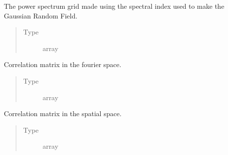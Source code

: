 \documentclass[letterpaper,10pt,english]{sphinxmanual}
\begin{document}
\begin{fulllineitems}
\begin{fulllineitems}
\begin{quote}
\begin{description}
\end{description}\end{quote}

\end{fulllineitems}


\begin{fulllineitems}
\label{\detokenize{gaussClass:gaussClass.GaussianRandomField.PowerSpectrum}}
\sphinxAtStartPar
The power spectrum grid made using the spectral index used to make the Gaussian Random Field.
\begin{quote}\begin{description}
\item[{Type}] \leavevmode
\sphinxAtStartPar
array

\end{description}\end{quote}

\end{fulllineitems}


\begin{fulllineitems}
\label{\detokenize{gaussClass:gaussClass.GaussianRandomField.corr_s}}
\sphinxAtStartPar
Correlation matrix in the fourier space.
\begin{quote}\begin{description}
\item[{Type}] \leavevmode
\sphinxAtStartPar
array

\end{description}\end{quote}

\end{fulllineitems}


\begin{fulllineitems}
\label{\detokenize{gaussClass:gaussClass.GaussianRandomField.corr_f}}
\sphinxAtStartPar
Correlation matrix in the spatial space.
\begin{quote}\begin{description}
\item[{Type}] \leavevmode
\sphinxAtStartPar
array


\end{description}
\end{quote}
\end{fulllineitems}
\end{fulllineitems}
\end{document}
